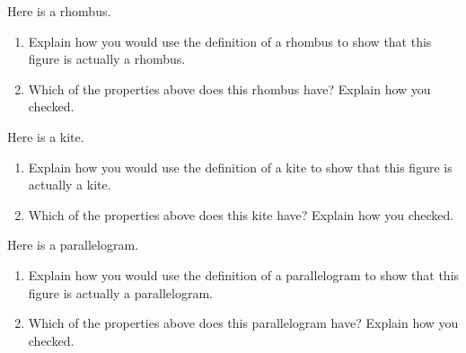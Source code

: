 \documentclass[noauthor, nooutcomes]{ximera}
\begin{document}
\pagebreak

\begin{problem}
Here is a rhombus.
\begin{image}  \end{image}
\begin{enumerate}
	\item Explain how you would use the definition of a rhombus to show that this figure is actually a rhombus.
	\item Which of the properties above does this rhombus have? Explain how you checked.
\end{enumerate}
\end{problem}

\pagebreak

\begin{problem}
Here is a kite.
\begin{image}  \end{image}
\begin{enumerate}
	\item Explain how you would use the definition of a kite to show that this figure is actually a kite.
	\item Which of the properties above does this kite have? Explain how you checked.
\end{enumerate}
\end{problem}

\pagebreak
\begin{problem}
Here is a parallelogram.
\begin{image}  \end{image}
\begin{enumerate}
	\item Explain how you would use the definition of a parallelogram to show that this figure is actually a parallelogram.
	\item Which of the properties above does this parallelogram have? Explain how you checked.
\end{enumerate}
\end{problem}
\end{document}
